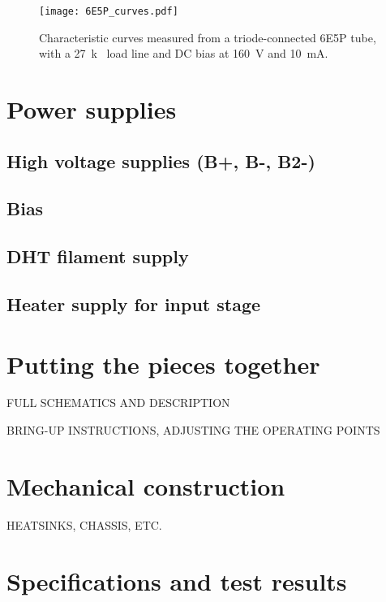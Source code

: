 \begin{figure}
\begin{center}
\texttt{[image: 6E5P\_curves.pdf]}
\caption{Characteristic curves measured from a triode-connected 6E5P tube, with a \SI{27}{k\Ohm} load line and DC bias at \SI{160}{V} and \SI{10}{mA}.}
\end{center}
\end{figure}


\section{Power supplies}

\subsection{High voltage supplies (B+, B-, B2-)}

\subsection{Bias}

\subsection{DHT filament supply}

\subsection{Heater supply for input stage}


\section{Putting the pieces together}

FULL SCHEMATICS AND DESCRIPTION

BRING-UP INSTRUCTIONS, ADJUSTING THE OPERATING POINTS


\section{Mechanical construction}

HEATSINKS, CHASSIS, ETC.


\section{Specifications and test results}

